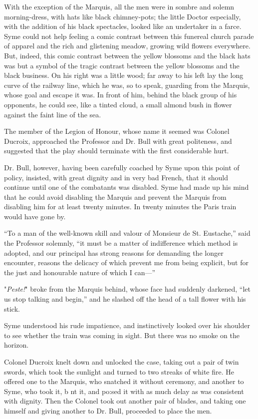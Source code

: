 \documentclass{book}
\begin{document}
With the exception of the Marquis, all the men were in sombre and solemn morning-dress, with hats like black chimney-pots; the little Doctor especially, with the addition of his black spectacles, looked like an undertaker in a farce. Syme could not help feeling a comic contrast between this funereal church parade of apparel and the rich and glistening meadow, growing wild flowers everywhere. But, indeed, this comic contrast between the yellow blossoms and the black hats was but a symbol of the tragic contrast between the yellow blossoms and the black business. On his right was a little wood; far away to his left lay the long curve of the railway line, which he was, so to speak, guarding from the Marquis, whose goal and escape it was. In front of him, behind the black group of his opponents, he could see, like a tinted cloud, a small almond bush in flower against the faint line of the sea.

The member of the Legion of Honour, whose name it seemed was Colonel Ducroix, approached the Professor and Dr. Bull with great politeness, and suggested that the play should terminate with the first considerable hurt.

Dr. Bull, however, having been carefully coached by Syme upon this point of policy, insisted, with great dignity and in very bad French, that it should continue until one of the combatants was disabled. Syme had made up his mind that he could avoid disabling the Marquis and prevent the Marquis from disabling him for at least twenty minutes. In twenty minutes the Paris train would have gone by.

“To a man of the well-known skill and valour of Monsieur de St. Eustache,” said the Professor solemnly, “it must be a matter of indifference which method is adopted, and our principal has strong reasons for demanding the longer encounter, reasons the delicacy of which prevent me from being explicit, but for the just and honourable nature of which I can—”

"\emph{Peste!}" broke from the Marquis behind, whose face had suddenly darkened, “let us stop talking and begin,” and he slashed off the head of a tall flower with his stick.

Syme understood his rude impatience, and instinctively looked over his shoulder to see whether the train was coming in sight. But there was no smoke on the horizon.

Colonel Ducroix knelt down and unlocked the case, taking out a pair of twin swords, which took the sunlight and turned to two streaks of white fire. He offered one to the Marquis, who snatched it without ceremony, and another to Syme, who took it, b nt it, and po:sed it with as much delay as was consistent with dignity. Then the Colonel took out another pair of blades, and taking one himself and giving another to Dr. Bull, proceeded to place the men.
\end{document}
